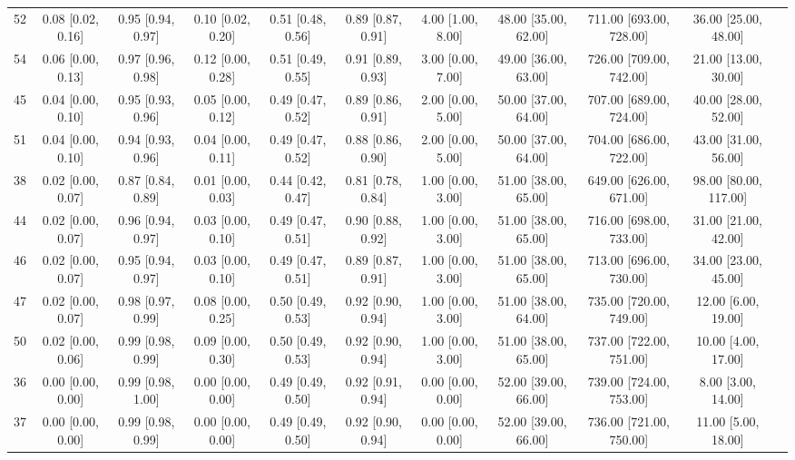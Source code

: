 \documentclass[8pt]{article}
\begin{document}
\begin{center}
\begin{footnotesize}
\begin{longtable}{|ccccccccccc|}
 52 &  0.08 [0.02, 0.16] &  0.95 [0.94, 0.97] &  0.10 [0.02, 0.20] &  0.51 [0.48, 0.56] &  0.89 [0.87, 0.91] &     4.00 [1.00, 8.00] &  48.00 [35.00, 62.00] &  711.00 [693.00, 728.00] &     36.00 [25.00, 48.00] \\
 54 &  0.06 [0.00, 0.13] &  0.97 [0.96, 0.98] &  0.12 [0.00, 0.28] &  0.51 [0.49, 0.55] &  0.91 [0.89, 0.93] &     3.00 [0.00, 7.00] &  49.00 [36.00, 63.00] &  726.00 [709.00, 742.00] &     21.00 [13.00, 30.00] \\
 45 &  0.04 [0.00, 0.10] &  0.95 [0.93, 0.96] &  0.05 [0.00, 0.12] &  0.49 [0.47, 0.52] &  0.89 [0.86, 0.91] &     2.00 [0.00, 5.00] &  50.00 [37.00, 64.00] &  707.00 [689.00, 724.00] &     40.00 [28.00, 52.00] \\
 51 &  0.04 [0.00, 0.10] &  0.94 [0.93, 0.96] &  0.04 [0.00, 0.11] &  0.49 [0.47, 0.52] &  0.88 [0.86, 0.90] &     2.00 [0.00, 5.00] &  50.00 [37.00, 64.00] &  704.00 [686.00, 722.00] &     43.00 [31.00, 56.00] \\
 38 &  0.02 [0.00, 0.07] &  0.87 [0.84, 0.89] &  0.01 [0.00, 0.03] &  0.44 [0.42, 0.47] &  0.81 [0.78, 0.84] &     1.00 [0.00, 3.00] &  51.00 [38.00, 65.00] &  649.00 [626.00, 671.00] &    98.00 [80.00, 117.00] \\
 44 &  0.02 [0.00, 0.07] &  0.96 [0.94, 0.97] &  0.03 [0.00, 0.10] &  0.49 [0.47, 0.51] &  0.90 [0.88, 0.92] &     1.00 [0.00, 3.00] &  51.00 [38.00, 65.00] &  716.00 [698.00, 733.00] &     31.00 [21.00, 42.00] \\
 46 &  0.02 [0.00, 0.07] &  0.95 [0.94, 0.97] &  0.03 [0.00, 0.10] &  0.49 [0.47, 0.51] &  0.89 [0.87, 0.91] &     1.00 [0.00, 3.00] &  51.00 [38.00, 65.00] &  713.00 [696.00, 730.00] &     34.00 [23.00, 45.00] \\
 47 &  0.02 [0.00, 0.07] &  0.98 [0.97, 0.99] &  0.08 [0.00, 0.25] &  0.50 [0.49, 0.53] &  0.92 [0.90, 0.94] &     1.00 [0.00, 3.00] &  51.00 [38.00, 64.00] &  735.00 [720.00, 749.00] &      12.00 [6.00, 19.00] \\
 50 &  0.02 [0.00, 0.06] &  0.99 [0.98, 0.99] &  0.09 [0.00, 0.30] &  0.50 [0.49, 0.53] &  0.92 [0.90, 0.94] &     1.00 [0.00, 3.00] &  51.00 [38.00, 65.00] &  737.00 [722.00, 751.00] &      10.00 [4.00, 17.00] \\
 36 &  0.00 [0.00, 0.00] &  0.99 [0.98, 1.00] &  0.00 [0.00, 0.00] &  0.49 [0.49, 0.50] &  0.92 [0.91, 0.94] &     0.00 [0.00, 0.00] &  52.00 [39.00, 66.00] &  739.00 [724.00, 753.00] &       8.00 [3.00, 14.00] \\
 37 &  0.00 [0.00, 0.00] &  0.99 [0.98, 0.99] &  0.00 [0.00, 0.00] &  0.49 [0.49, 0.50] &  0.92 [0.90, 0.94] &     0.00 [0.00, 0.00] &  52.00 [39.00, 66.00] &  736.00 [721.00, 750.00] &      11.00 [5.00, 18.00] \\

\end{longtable}
\end{footnotesize}
\end{center}
\end{document}
